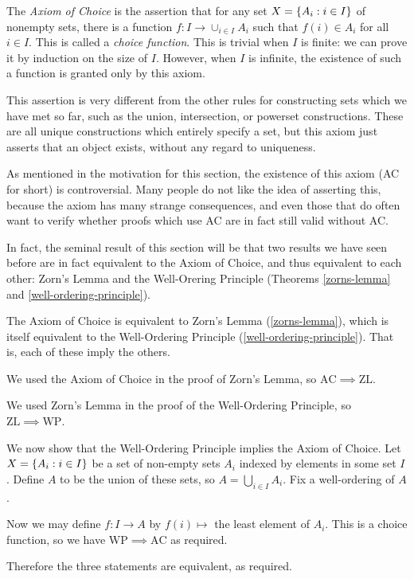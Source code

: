 \documentclass{article}
\begin{document}
The \textit{Axiom of Choice} is the assertion that for any set $X = \left\lbrace A_i : i \in I \right\rbrace$ of nonempty sets, there is a function $f : I \to \cup_{i \in I} A_i$ such that $f(i) \in A_i$ for all $i \in I$. This is called a \textit{choice function}. This is trivial when $I$ is finite: we can prove it by induction on the size of $I$. However, when $I$ is infinite, the existence of such a function is granted only by this axiom.

\begin{note}
	This assertion is very different from the other rules for constructing sets which we have met so far, such as the union, intersection, or powerset constructions. These are all unique constructions which entirely specify a set, but this axiom just asserts that an object exists, without any regard to uniqueness.
\end{note}

\begin{note}
	As mentioned in the motivation for this section, the existence of this axiom (AC for short) is controversial. Many people do not like the idea of asserting this, because the axiom has many strange consequences, and even those that do often want to verify whether proofs which use AC are in fact still valid without AC.
\end{note}

In fact, the seminal result of this section will be that two results we have seen before are in fact equivalent to the Axiom of Choice, and thus equivalent to each other: Zorn's Lemma and the Well-Orering Principle (Theorems \ref{zorns-lemma} and \ref{well-ordering-principle}).

\begin{theorem}
    The Axiom of Choice is equivalent to Zorn's Lemma (\ref{zorns-lemma}), which is itself equivalent to the Well-Ordering Principle (\ref{well-ordering-principle}). That is, each of these imply the others.
\end{theorem}

\begin{prf}
    We used the Axiom of Choice in the proof of Zorn's Lemma, so $\mathrm{AC} \implies \mathrm{ZL}$.
    
    We used Zorn's Lemma in the proof of the Well-Ordering Principle, so $\mathrm{ZL} \implies \mathrm{WP}$.
    
    We now show that the Well-Ordering Principle implies the Axiom of Choice. Let $X = \left\lbrace A_i : i \in I \right\rbrace$ be a set of non-empty sets $A_i$ indexed by elements in some set $I$. Define $A$ to be the union of these sets, so $A = \bigcup_{i \in I} A_i$. Fix a well-ordering of $A$.
    
    Now we may define $f : I \to A$ by $f(i) \mapsto$ the least element of $A_i$. This is a choice function, so we have $\mathrm{WP} \implies \mathrm{AC}$ as required.
    
    Therefore the three statements are equivalent, as required.
\end{prf}
\end{document}
